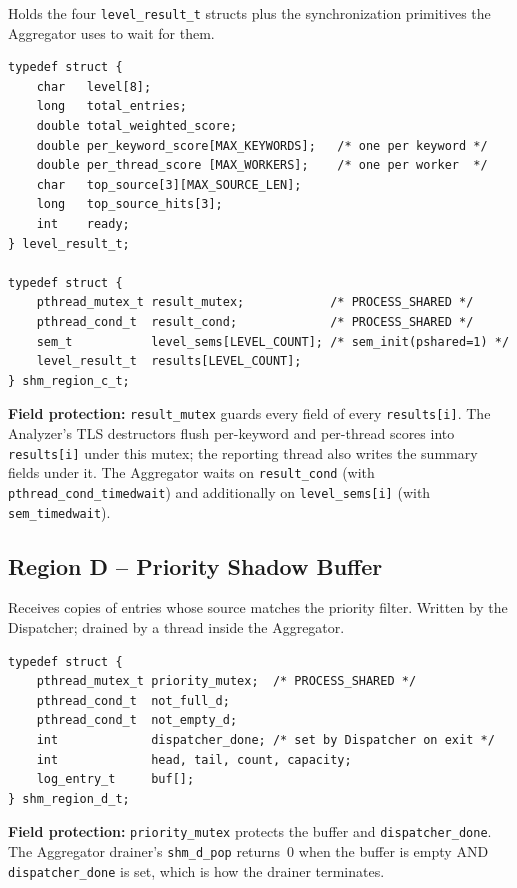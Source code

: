 \documentclass[11pt,a4paper]{article}
\newcommand{\code}[1]{\texttt{\small #1}}
\begin{document}
Holds the four \code{level\_result\_t} structs plus the synchronization
primitives the Aggregator uses to wait for them.

\begin{lstlisting}[style=Cstyle]
typedef struct {
    char   level[8];
    long   total_entries;
    double total_weighted_score;
    double per_keyword_score[MAX_KEYWORDS];   /* one per keyword */
    double per_thread_score [MAX_WORKERS];    /* one per worker  */
    char   top_source[3][MAX_SOURCE_LEN];
    long   top_source_hits[3];
    int    ready;
} level_result_t;

typedef struct {
    pthread_mutex_t result_mutex;            /* PROCESS_SHARED */
    pthread_cond_t  result_cond;             /* PROCESS_SHARED */
    sem_t           level_sems[LEVEL_COUNT]; /* sem_init(pshared=1) */
    level_result_t  results[LEVEL_COUNT];
} shm_region_c_t;
\end{lstlisting}

\textbf{Field protection:} \code{result\_mutex} guards every field of every
\code{results[i]}. The Analyzer's TLS destructors flush per-keyword and
per-thread scores into \code{results[i]} under this mutex; the reporting
thread also writes the summary fields under it. The Aggregator waits on
\code{result\_cond} (with \code{pthread\_cond\_timedwait}) and
additionally on \code{level\_sems[i]} (with \code{sem\_timedwait}).

\subsection{Region D -- Priority Shadow Buffer}

Receives copies of entries whose source matches the priority filter.
Written by the Dispatcher; drained by a thread inside the Aggregator.

\begin{lstlisting}[style=Cstyle]
typedef struct {
    pthread_mutex_t priority_mutex;  /* PROCESS_SHARED */
    pthread_cond_t  not_full_d;
    pthread_cond_t  not_empty_d;
    int             dispatcher_done; /* set by Dispatcher on exit */
    int             head, tail, count, capacity;
    log_entry_t     buf[];
} shm_region_d_t;
\end{lstlisting}

\textbf{Field protection:} \code{priority\_mutex} protects the buffer and
\code{dispatcher\_done}. The Aggregator drainer's \code{shm\_d\_pop}
returns~0 when the buffer is empty AND \code{dispatcher\_done} is set,
which is how the drainer terminates.
\end{document}
